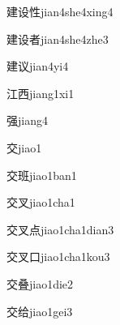 \begin{verbete}[8;6;8]{建设性}{jian4she4xing4}
\end{verbete}

\begin{verbete}[8;6;8]{建设者}{jian4she4zhe3}
\end{verbete}

\begin{verbete}[8;5]{建议}{jian4yi4}
\end{verbete}

\begin{verbete*}[6;6]{江西}{jiang1xi1}
\end{verbete*}

\begin{verbete}[12]{强}{jiang4}
\end{verbete}

\begin{verbete}[6]{交}{jiao1}
\end{verbete}

\begin{verbete}[6;10]{交班}{jiao1ban1}
\end{verbete}

\begin{verbete}[6;3]{交叉}{jiao1cha1}
\end{verbete}

\begin{verbete}[6;3;3]{交叉点}{jiao1cha1dian3}
\end{verbete}

\begin{verbete}[6;3;3]{交叉口}{jiao1cha1kou3}
\end{verbete}

\begin{verbete}[6;13]{交叠}{jiao1die2}
\end{verbete}

\begin{verbete}[6;9]{交给}{jiao1gei3}
\end{verbete}

